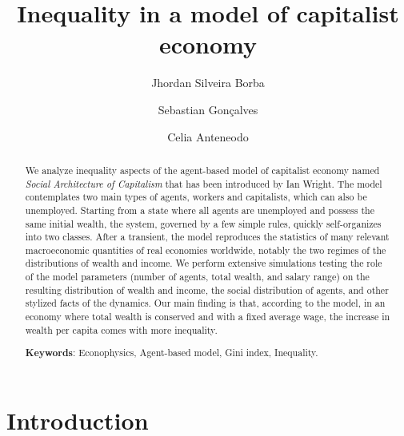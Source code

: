 \documentclass[11pt,a4paper]{revtex4-1}
\begin{document}
\title{Inequality in a model of capitalist economy}

\author{Jhordan Silveira Borba}  


\author{Sebastian Gonçalves}

\author{Celia Anteneodo}

 

\begin{abstract}
We analyze inequality aspects of the agent-based model of capitalist economy named {\it Social Architecture of Capitalism} that has been introduced by Ian Wright. The model contemplates two main types of agents, workers and capitalists, which can also be unemployed. Starting from a state where all agents are unemployed and possess the same initial wealth,  the system, governed by a few simple rules, quickly self-organizes into two classes. After a transient, the model reproduces the statistics of many relevant macroeconomic quantities of real economies worldwide, notably the two regimes of the distributions of wealth and income.  
We perform extensive simulations testing the role of the model parameters (number of agents, total wealth, and salary range) on the resulting distribution of wealth and income, the social distribution of agents, and other stylized facts of the dynamics. 
Our main finding is that, according to the model, in an economy where total wealth is conserved and with a fixed average wage, 
the increase in wealth per capita comes with more inequality.

\noindent
\textbf{Keywords}: Econophysics, Agent-based model, Gini index, Inequality. 

\end{abstract}

\maketitle
 
\section{Introduction}
\label{sec:introduction}
\end{document}
